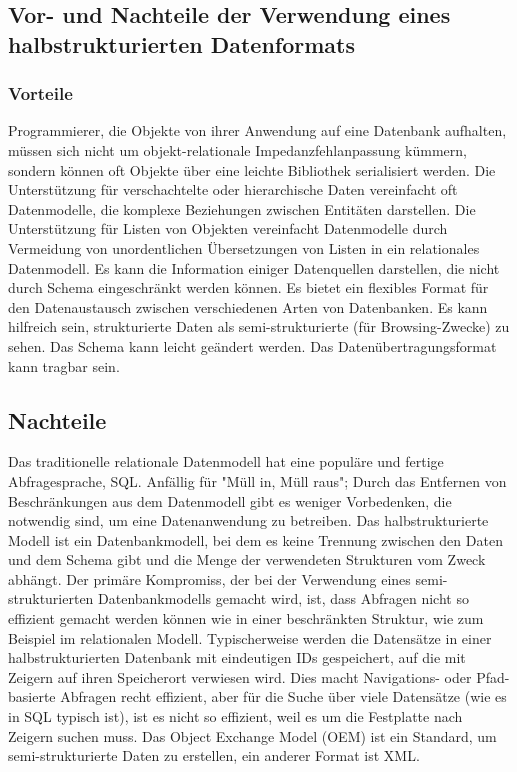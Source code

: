 \subsection{Vor- und Nachteile der Verwendung eines halbstrukturierten Datenformats}
\subsubsection{Vorteile}
Programmierer, die Objekte von ihrer Anwendung auf eine Datenbank aufhalten, müssen sich nicht um objekt-relationale Impedanzfehlanpassung kümmern, sondern können oft Objekte über eine leichte Bibliothek serialisiert werden.
Die Unterstützung für verschachtelte oder hierarchische Daten vereinfacht oft Datenmodelle, die komplexe Beziehungen zwischen Entitäten darstellen.
Die Unterstützung für Listen von Objekten vereinfacht Datenmodelle durch Vermeidung von unordentlichen Übersetzungen von Listen in ein relationales Datenmodell.
Es kann die Information einiger Datenquellen darstellen, die nicht durch Schema eingeschränkt werden können.
Es bietet ein flexibles Format für den Datenaustausch zwischen verschiedenen Arten von Datenbanken.
Es kann hilfreich sein, strukturierte Daten als semi-strukturierte (für Browsing-Zwecke) zu sehen.
Das Schema kann leicht geändert werden.
Das Datenübertragungsformat kann tragbar sein. \cite{boneman2007}
\subsection{Nachteile}
Das traditionelle relationale Datenmodell hat eine populäre und fertige Abfragesprache, SQL.
Anfällig für "Müll in, Müll raus"; Durch das Entfernen von Beschränkungen aus dem Datenmodell gibt es weniger Vorbedenken, die notwendig sind, um eine Datenanwendung zu betreiben.
Das halbstrukturierte Modell ist ein Datenbankmodell, bei dem es keine Trennung zwischen den Daten und dem Schema gibt und die Menge der verwendeten Strukturen vom Zweck abhängt.
Der primäre Kompromiss, der bei der Verwendung eines semi-strukturierten Datenbankmodells gemacht wird, ist, dass Abfragen nicht so effizient gemacht werden können wie in einer beschränkten Struktur, wie zum Beispiel im relationalen Modell. Typischerweise werden die Datensätze in einer halbstrukturierten Datenbank mit eindeutigen IDs gespeichert, auf die mit Zeigern auf ihren Speicherort verwiesen wird. Dies macht Navigations- oder Pfad-basierte Abfragen recht effizient, aber für die Suche über viele Datensätze (wie es in SQL typisch ist), ist es nicht so effizient, weil es um die Festplatte nach Zeigern suchen muss. \cite{bry2001}
Das Object Exchange Model (OEM) ist ein Standard, um semi-strukturierte Daten zu erstellen, ein anderer Format ist XML.
